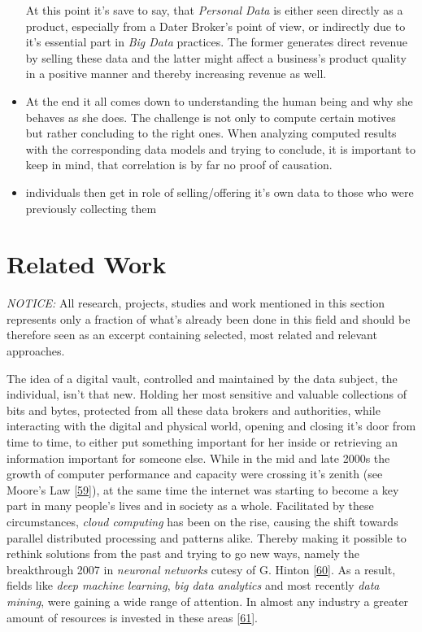 \documentclass[12pt,english,a4paper,titlepage,cleardoublepage=empty,dottedtoc]{report}
\begin{document}
\begin{itemize}
  At this point it's save to say, that \emph{Personal Data} is either
  seen directly as a product, especially from a Dater Broker's point of
  view, or indirectly due to it's essential part in \emph{Big Data}
  practices. The former generates direct revenue by selling these data
  and the latter might affect a business's product quality in a positive
  manner and thereby increasing revenue as well.
\item
  At the end it all comes down to understanding the human being and why
  she behaves as she does. The challenge is not only to compute certain
  motives but rather concluding to the right ones. When analyzing
  computed results with the corresponding data models and trying to
  conclude, it is important to keep in mind, that correlation is by far
  no proof of causation.
\item
  individuals then get in role of selling/offering it's own data to
  those who were previously collecting them
\end{itemize}

\hypertarget{related-work}{\section{Related Work}\label{related-work}}

\emph{NOTICE:} All research, projects, studies and work mentioned in
this section represents only a fraction of what's already been done in
this field and should be therefore seen as an excerpt containing
selected, most related and relevant approaches.

The idea of a digital vault, controlled and maintained by the data
subject, the individual, isn't that new. Holding her most sensitive and
valuable collections of bits and bytes, protected from all these data
brokers and authorities, while interacting with the digital and physical
world, opening and closing it's door from time to time, to either put
something important for her inside or retrieving an information
important for someone else. While in the mid and late 2000s the growth
of computer performance and capacity were crossing it's zenith (see
Moore's Law {[}\protect\hyperlink{ref-paper_1965_moors-law}{59}{]}), at
the same time the internet was starting to become a key part in many
people's lives and in society as a whole. Facilitated by these
circumstances, \emph{cloud computing} has been on the rise, causing the
shift towards parallel distributed processing and patterns alike.
Thereby making it possible to rethink solutions from the past and trying
to go new ways, namely the breakthrough 2007 in \emph{neuronal networks}
cutesy of G. Hinton
{[}\protect\hyperlink{ref-podcast_2015_cre-neuronale-netze}{60}{]}. As a
result, fields like \emph{deep machine learning}, \emph{big data
analytics} and most recently \emph{data mining}, were gaining a wide
range of attention. In almost any industry a greater amount of resources
is invested in these areas
{[}\protect\hyperlink{ref-web_2016_industries-intention-to-invest-in-big-data}{61}{]}.
\end{document}

